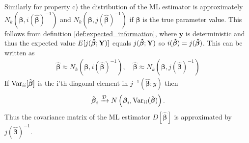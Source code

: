 Similarly for property c) the distribution of the ML estimator is approximately $N_k(\boldsymbol{\beta}, i(\hat{\boldsymbol{\beta}})^{-1})$ and $N_k(\boldsymbol{\beta}, j(\hat{\boldsymbol{\beta}})^{-1})$ if $\boldsymbol{\beta}$ is the true parameter value. This follows from definition \ref{def:expected_information}, where $\textbf{y}$ is deterministic and thus the expected value $E[j(\operatorname{\boldsymbol{\hat{\beta}}} ; \textbf{Y})]$ equals $j(\operatorname{\boldsymbol{\hat{\beta}}}; \textbf{Y})$ so $i(\operatorname{\boldsymbol{\hat{\beta}}}) = j(\operatorname{\boldsymbol{\hat{\beta}}})$. This can be written as
\begin{align*}
    \hat{\boldsymbol{\beta}} \approx N_k(\boldsymbol{\beta}, i(\hat{\boldsymbol{\beta}})^{-1}), \quad \hat{\boldsymbol{\beta}} \approx N_k(\boldsymbol{\beta}, j(\hat{\boldsymbol{\beta}})^{-1})
\end{align*}
If $\operatorname{\text{Var}}_{ii}[\hat{\boldsymbol{\beta}}]$ is the i'th diagonal element in $j^{-1}(\hat{\boldsymbol{\beta}};y)$ then
\begin{align*}
    \hat{\boldsymbol{\beta}}_i \xrightarrow{\mathcal{D}} N\left( \boldsymbol{\beta}_i, \operatorname{\text{Var}}_{ii}(\hat{\boldsymbol{\beta}}) \right).
\end{align*}
Thus the covariance matrix of the ML estimator $D[\hat{\boldsymbol{\beta}}]$ is approximated by $j(\hat{\boldsymbol{\beta}})^{-1}$. 
